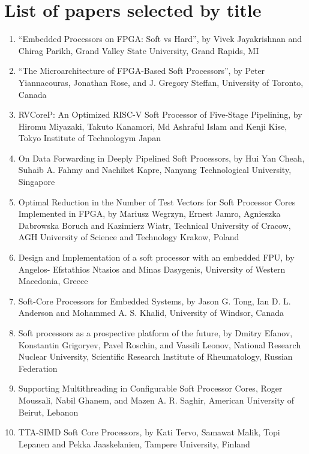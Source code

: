 \section{List of papers selected by title}
\begin{enumerate}
    \item “Embedded Processors on FPGA: Soft vs Hard”, by Vivek Jayakrishnan and Chirag
Parikh, Grand Valley State University, Grand Rapids, MI
    \item “The Microarchitecture of FPGA-Based Soft Processors”, by Peter Yiannacouras,
Jonathan Rose, and J. Gregory Steffan, University of Toronto, Canada
    \item RVCoreP: An Optimized RISC-V Soft Processor of Five-Stage Pipelining, by Hiromu
Miyazaki, Takuto Kanamori, Md Ashraful Islam and Kenji Kise, Tokyo Institute of
Technologym Japan
    \item On Data Forwarding in Deeply Pipelined Soft Processors, by Hui Yan Cheah, Suhaib
A. Fahmy and Nachiket Kapre, Nanyang Technological University, Singapore
    \item Optimal Reduction in the Number of Test Vectors for Soft Processor Cores
Implemented in FPGA, by Mariusz Wegrzyn, Ernest Jamro, Agnieszka Dabrowska 
Boruch and Kazimierz Wiatr, Technical University of Cracow, AGH University of
Science and Technology Krakow, Poland
\item Design and Implementation of a soft processor with an embedded FPU, by Angelos-
Efstathios Ntasios and Minas Dasygenis, University of Western Macedonia, Greece
    \item Soft-Core Processors for Embedded Systems, by Jason G. Tong, Ian D. L. Anderson
and Mohammed A. S. Khalid, University of Windsor, Canada
    \item Soft processors as a prospective platform of the future, by Dmitry Efanov, Konstantin
Grigoryev, Pavel Roschin, and Vassili Leonov, National Research Nuclear University,
Scientific Research Institute of Rheumatology, Russian Federation
    \item Supporting Multithreading in Configurable Soft Processor Cores, Roger Moussali,
Nabil Ghanem, and Mazen A. R. Saghir, American University of Beirut, Lebanon
    \item TTA-SIMD Soft Core Processors, by Kati Tervo, Samawat Malik, Topi Lepanen and
Pekka Jaaskelanien, Tampere University, Finland
\end{enumerate}

